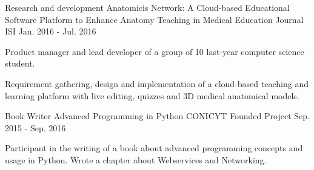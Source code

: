 \begin{cventries}
  \cventry
    {Research and development}
    {Anatomicis Network: A Cloud-based Educational Software Platform to Enhance Anatomy Teaching in Medical Education}
    {Journal ISI}
    {Jan. 2016 - Jul. 2016}
    {
      \begin{cvitems}
        \item {Product manager and lead developer of a group of 10 last-year computer science student.}
        \item {Requirement gathering, design and implementation of a cloud-based teaching and learning platform with live editing, quizzes and 3D medical anatomical models.}
      \end{cvitems}
    }
  \cventry
    {Book Writer}
    {Advanced Programming in Python}
    {CONICYT Founded Project}
    {Sep. 2015 - Sep. 2016}
    {
      \begin{cvitems}
        \item {Participant in the writing of a book about advanced programming concepts and usage in Python. Wrote a chapter about Webservices and Networking.}
      \end{cvitems}
    }
\end{cventries}
